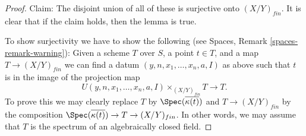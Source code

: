 \begin{proof}
\medskip\noindent
Claim: The disjoint union of all of these is surjective onto $(X/Y)_{fin}$.
It is clear that if the claim holds, then the lemma is true.

\medskip\noindent
To show surjectivity we have to show the following (see
Spaces, Remark \ref{spaces-remark-warning}): Given a scheme $T$ over
$S$, a point $t \in T$, and a map $T \to (X/Y)_{fin}$ we can find a datum
$(y, n, x_1, \ldots, x_n, a, I)$ as above such that
$t$ is in the image of the projection map
$$
U(y, n, x_1, \ldots, x_n, a, I) \times_{(X/Y)_{fin}} T \longrightarrow T.
$$
To prove this we may clearly replace $T$ by
$\Spec(\overline{\kappa(t)})$ and
$T \to (X/Y)_{fin}$ by the composition
$\Spec(\overline{\kappa(t)}) \to T \to (X/Y)_{fin}$.
In other words, we may assume that $T$ is
the spectrum of an algebraically closed field.


\end{proof}

